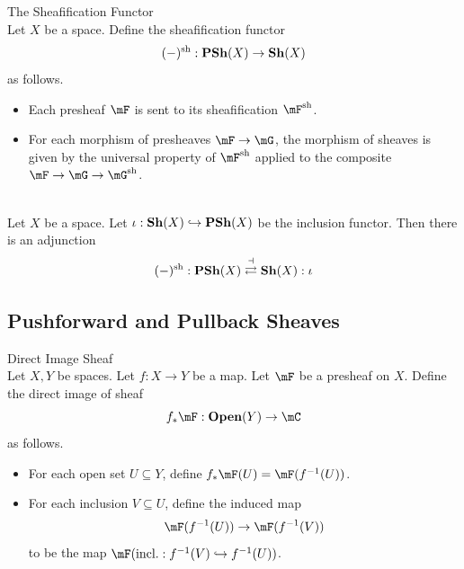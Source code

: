 \documentclass[a4paper]{article}
\begin{document}
\begin{defn}{The Sheafification Functor}{}\\
Let $X$ be a space. Define the sheafification functor $$(-)^\text{sh}:\bold{PSh}(X)\to\bold{Sh}(X)$$ as follows. 
\begin{itemize}
\item Each presheaf $\mF$ is sent to its sheafification $\mF^\text{sh}$. 
\item For each morphism of presheaves $\mF\to\mG$, the morphism of sheaves is given by the universal property of $\mF^\text{sh}$ applied to the composite $\mF\to\mG\to\mG^\text{sh}$. 
\end{itemize}
\end{defn}

\begin{prp}{}{}\\
Let $X$ be a space. Let $\iota:\bold{Sh}(X)\hookrightarrow\bold{PSh}(X)$ be the inclusion functor. Then there is an adjunction $$(-)^\text{sh}:\bold{PSh}(X)\overset{\dashv}{\rightleftarrows}\bold{Sh}(X):\iota$$
\end{prp}

\subsection{Pushforward and Pullback Sheaves}
\begin{defn}{Direct Image Sheaf}{}\\
Let $X,Y$ be spaces. Let $f:X\to Y$ be a map. Let $\mF$ be a presheaf on $X$. Define the direct image of sheaf $$f_\ast\mF:\bold{Open}(Y)\to\mC$$ as follows. 
\begin{itemize}
\item For each open set $U\subseteq Y$, define $f_\ast\mF(U)=\mF(f^{-1}(U))$. 
\item For each inclusion $V\subseteq U$, define the induced map $$\mF(f^{-1}(U))\to\mF(f^{-1}(V))$$ to be the map $\mF(\text{incl.}:f^{-1}(V)\hookrightarrow f^{-1}(U))$. 
\end{itemize}
\end{defn}
\end{document}
